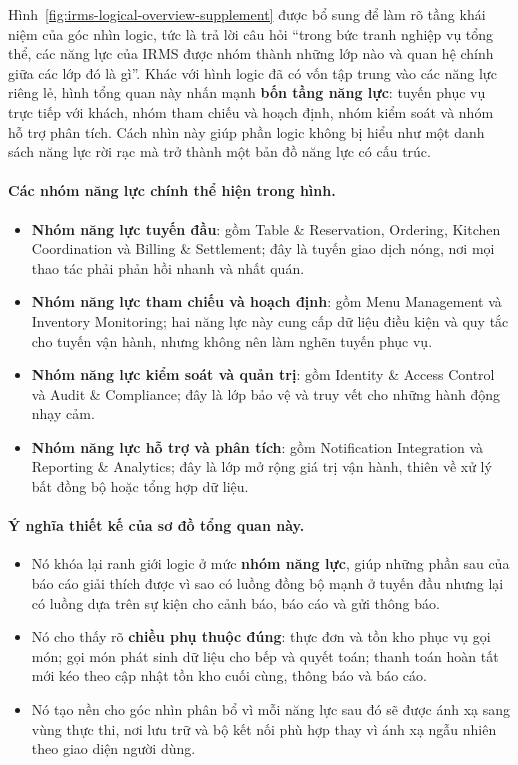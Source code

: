 \documentclass[11pt,a4paper]{article}
\begin{document}
Hình~\ref{fig:irms-logical-overview-supplement} được bổ sung để làm rõ tầng khái niệm của góc nhìn logic, tức là trả lời câu hỏi \enquote{trong bức tranh nghiệp vụ tổng thể, các năng lực của IRMS được nhóm thành những lớp nào và quan hệ chính giữa các lớp đó là gì}. Khác với hình logic đã có vốn tập trung vào các năng lực riêng lẻ, hình tổng quan này nhấn mạnh \textbf{bốn tầng năng lực}: tuyến phục vụ trực tiếp với khách, nhóm tham chiếu và hoạch định, nhóm kiểm soát và nhóm hỗ trợ phân tích. Cách nhìn này giúp phần logic không bị hiểu như một danh sách năng lực rời rạc mà trở thành một bản đồ năng lực có cấu trúc.

\paragraph{Các nhóm năng lực chính thể hiện trong hình.}
\begin{itemize}
  \item \textbf{Nhóm năng lực tuyến đầu}: gồm \textsf{Table \& Reservation}, \textsf{Ordering}, \textsf{Kitchen Coordination} và \textsf{Billing \& Settlement}; đây là tuyến giao dịch nóng, nơi mọi thao tác phải phản hồi nhanh và nhất quán.
  \item \textbf{Nhóm năng lực tham chiếu và hoạch định}: gồm \textsf{Menu Management} và \textsf{Inventory Monitoring}; hai năng lực này cung cấp dữ liệu điều kiện và quy tắc cho tuyến vận hành, nhưng không nên làm nghẽn tuyến phục vụ.
  \item \textbf{Nhóm năng lực kiểm soát và quản trị}: gồm \textsf{Identity \& Access Control} và \textsf{Audit \& Compliance}; đây là lớp bảo vệ và truy vết cho những hành động nhạy cảm.
  \item \textbf{Nhóm năng lực hỗ trợ và phân tích}: gồm \textsf{Notification Integration} và \textsf{Reporting \& Analytics}; đây là lớp mở rộng giá trị vận hành, thiên về xử lý bất đồng bộ hoặc tổng hợp dữ liệu.
\end{itemize}

\paragraph{Ý nghĩa thiết kế của sơ đồ tổng quan này.}
\begin{itemize}
  \item Nó khóa lại ranh giới logic ở mức \textbf{nhóm năng lực}, giúp những phần sau của báo cáo giải thích được vì sao có luồng đồng bộ mạnh ở tuyến đầu nhưng lại có luồng dựa trên sự kiện cho cảnh báo, báo cáo và gửi thông báo.
  \item Nó cho thấy rõ \textbf{chiều phụ thuộc đúng}: thực đơn và tồn kho phục vụ gọi món; gọi món phát sinh dữ liệu cho bếp và quyết toán; thanh toán hoàn tất mới kéo theo cập nhật tồn kho cuối cùng, thông báo và báo cáo.
  \item Nó tạo nền cho góc nhìn phân bổ vì mỗi năng lực sau đó sẽ được ánh xạ sang vùng thực thi, nơi lưu trữ và bộ kết nối phù hợp thay vì ánh xạ ngẫu nhiên theo giao diện người dùng.
\end{itemize}
\end{document}
